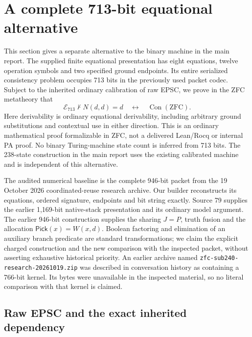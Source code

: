 \section{A complete 713-bit equational alternative}
\label{sec:e713}

This section gives a separate alternative to the binary machine in the main
report.  The supplied finite equational presentation has eight equations,
twelve operation symbols and two specified ground endpoints. Its entire
serialized consistency problem occupies 713 bits in the previously used
packet codec. Subject to the inherited ordinary calibration of raw EPSC,
we prove in the ZFC metatheory that
\begin{equation}
 \mathcal E_{713}\not\vdash N(d,d)=d
 \quad\longleftrightarrow\quad \operatorname{Con}(\mathrm{ZFC}).
 \label{eq:e713-calibration}
\end{equation}
Here derivability is ordinary equational derivability, including arbitrary
ground substitutions and contextual use in either direction. This is an
ordinary mathematical proof formalizable in ZFC, not a delivered Lean/Rocq
or internal PA proof. No binary Turing-machine state count is inferred from
713 bits. The 238-state construction in the main report uses the existing
calibrated machine and is independent of this alternative.

The audited numerical baseline is the complete 946-bit packet from the
19 October 2026 coordinated-reuse research archive. Our builder reconstructs its
equations, ordered signature, endpoints and bit string exactly. Source 79
supplies the earlier 1,169-bit native-stack presentation and its ordinary
model argument. The earlier 946-bit construction supplies the sharing
$J=P$, truth fusion and the allocation $\mathsf{Pick}(x)=W(x,d)$.
Boolean factoring and elimination of an auxiliary branch predicate are
standard transformations; we claim the explicit charged construction and
the new comparison with the inspected packet, without asserting exhaustive
historical priority. An earlier archive named
\texttt{zfc-sub240-research-20261019.zip} was described in conversation
history as containing a 766-bit kernel. Its bytes were unavailable in the
inspected material, so no literal comparison with that kernel is claimed.

\subsection{Raw EPSC and the exact inherited dependency}

